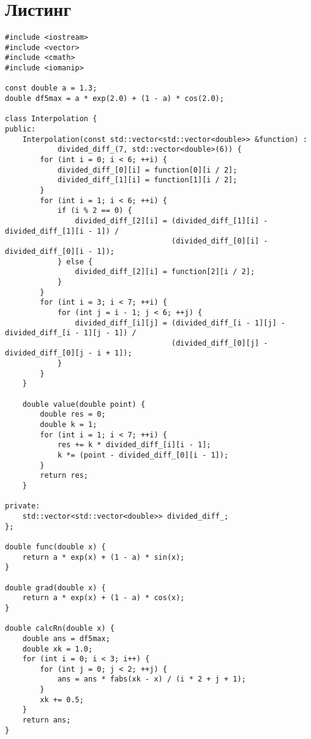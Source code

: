 \documentclass[10pt]{scrartcl}
\makeatletter
\newcommand{\verbatimfont}[1]{\renewcommand{\verbatim@font}{\ttfamily#1}}
\makeatother
\begin{document}
\section*{Листинг}
\verbatimfont{\small}
\begin{verbatim}
#include <iostream>
#include <vector>
#include <cmath>
#include <iomanip>

const double a = 1.3;
double df5max = a * exp(2.0) + (1 - a) * cos(2.0);

class Interpolation {
public:
    Interpolation(const std::vector<std::vector<double>> &function) :
            divided_diff_(7, std::vector<double>(6)) {
        for (int i = 0; i < 6; ++i) {
            divided_diff_[0][i] = function[0][i / 2];
            divided_diff_[1][i] = function[1][i / 2];
        }
        for (int i = 1; i < 6; ++i) {
            if (i % 2 == 0) {
                divided_diff_[2][i] = (divided_diff_[1][i] - divided_diff_[1][i - 1]) /
                                      (divided_diff_[0][i] - divided_diff_[0][i - 1]);
            } else {
                divided_diff_[2][i] = function[2][i / 2];
            }
        }
        for (int i = 3; i < 7; ++i) {
            for (int j = i - 1; j < 6; ++j) {
                divided_diff_[i][j] = (divided_diff_[i - 1][j] - divided_diff_[i - 1][j - 1]) /
                                      (divided_diff_[0][j] - divided_diff_[0][j - i + 1]);
            }
        }
    }

    double value(double point) {
        double res = 0;
        double k = 1;
        for (int i = 1; i < 7; ++i) {
            res += k * divided_diff_[i][i - 1];
            k *= (point - divided_diff_[0][i - 1]);
        }
        return res;
    }

private:
    std::vector<std::vector<double>> divided_diff_;
};

double func(double x) {
    return a * exp(x) + (1 - a) * sin(x);
}

double grad(double x) {
    return a * exp(x) + (1 - a) * cos(x);
}

double calcRn(double x) {
    double ans = df5max;
    double xk = 1.0;
    for (int i = 0; i < 3; i++) {
        for (int j = 0; j < 2; ++j) {
            ans = ans * fabs(xk - x) / (i * 2 + j + 1);
        }
        xk += 0.5;
    }
    return ans;
}


\end{verbatim}
\end{document}
